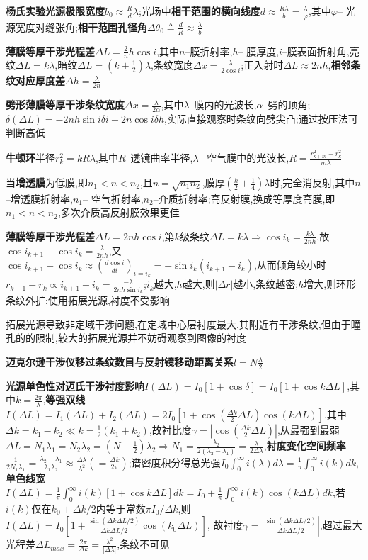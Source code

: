 \documentclass[10pt,a4paper]{article}
\begin{document}
\textbf{杨氏实验光源极限宽度}$b_0\approx\frac{R}{d}\lambda$;光场中\textbf{相干范围的横向线度}$d\approx\frac{R\lambda}{b}=\frac{\lambda}{\varphi}$,其中$\varphi$-- 光源宽度对缝张角;\textbf{相干范围孔径角}$\Delta\theta_0\triangleq\frac{d}{R}\approx\frac{\lambda}{b}$

\textbf{薄膜等厚干涉光程差}$\Delta L=\frac2nh\cos i$,其中$n$--膜折射率,$h$-- 膜厚度,$i$--膜表面折射角,亮纹$\Delta L=k\lambda$,暗纹$\Delta L=(k+\frac{1}{2})\lambda$,条纹宽度$\Delta x=\frac{\lambda}{2\cos i}$;正入射时$\Delta L\approx2nh$,\textbf{相邻条纹对应厚度差}$\Delta h=\frac{\lambda}{2n}$

\textbf{劈形薄膜等厚干涉条纹宽度}$\Delta x=\frac{\lambda}{2\alpha}$,其中$\lambda$--膜内的光波长,$\alpha$--劈的顶角;$\delta(\Delta L)=-2nh\sin i
\delta i+2n\cos i\delta h$,实际直接观察时条纹向劈尖凸;通过按压法可判断高低

\textbf{牛顿环}半径$r_k^2=kR\lambda$,其中$R$--透镜曲率半径,$\lambda$-- 空气膜中的光波长,$R=\frac{r_{k+m}^2-r_k^2}{m\lambda}$

当\textbf{增透膜}为低膜,即$n_1<n<n_2$,且$n=\sqrt{n_1n_2}$,膜厚$(\frac{k}{2}+\frac{1}{4})\lambda$时,完全消反射,其中$n$--增透膜折射率,$n_1$-- 空气折射率,$n_2$--介质折射率;高反射膜,换成等厚度高膜,即$n_1<n<n_2$,多次介质高反射膜效果更佳

\textbf{薄膜等厚干涉光程差}$\Delta L=2nh\cos i$,第$k$级条纹$\Delta L=k\lambda\Longrightarrow\cos i_k=\frac{k\lambda}{2nh}$,故$\cos i_{k+1}-\cos i_{k}=\frac{\lambda}{2nh}$,又$\cos i_{k+1}-\cos i_{k}\approx(\frac{d\cos i}{di})_{i=i_k}=-\sin i_k(i_{k+1}-i_{k})$,从而倾角较小时$r_{k+1}-r_{k}\propto i_{k+1}-i_{k}=\frac{-\lambda}{2nh\sin i_k}$;$i_k$越大,$h$越大,则$|\Delta r|$越小,条纹越密;$h$增大,则环形条纹外扩;使用拓展光源,衬度不受影响

拓展光源导致非定域干涉问题,在定域中心层衬度最大,其附近有干涉条纹,但由于瞳孔的的限制,较大的拓展光源并不妨碍观察到图像的衬度

\textbf{迈克尔逊干涉仪移过条纹数目与反射镜移动距离关系}$l=N\frac{\lambda}{2}$

\textbf{光源单色性对迈氏干涉衬度影响}$I(\Delta L)=I_0[1+\cos\delta]=I_0[1+\cos k\Delta L]$,其中$k=\frac{2\pi}{\lambda}$,\textbf{等强双线}$I(\Delta L)=I_1(\Delta L)+I_2(\Delta L)=2I_0[1+\cos(\frac{\Delta k}{2}\Delta L)\cos(k\Delta L)]$,其中$\Delta k=k_1-k_2\ll k=\frac{1}{2}(k_1+k_2)$,故衬比度$\gamma=|\cos(\frac{\Delta k}{2}\Delta L)|$,从最强到最弱$\Delta L=N_1\lambda_1=N_2\lambda_2=(N-\frac{1}{2})\lambda_2\Longrightarrow N_1=\frac{\lambda_2}{2(\lambda_2-\lambda_1)}=\frac{\lambda}{2\Delta\lambda}$,\textbf{衬度变化空间频率}$\frac{1}{2N_1\lambda_1}=\frac{\lambda_2-\lambda_1}{\lambda_1\lambda_2}\approx\frac{\Delta\lambda}{\lambda^2}(=\frac{\Delta k}{2\pi})$;谱密度积分得总光强$I_0\int_0^\infty i(\lambda)d\lambda=\frac{1}{\pi}\int_0^\infty i(k)dk$,\textbf{单色线宽}$I(\Delta L)=\frac{1}{\pi}\int_0^\infty i(k)[1+\cos k\Delta L]dk=I_0+\frac{1}{\pi}\int_0^\infty i(k)\cos(k\Delta L)dk$,若$i(k)$仅在$k_0\pm\Delta k/2$内等于常数$\pi I_0/\Delta k$,则$I(\Delta L)=I_0[1+\frac{\sin(\Delta k\Delta L/2)}{\Delta k\Delta L/2}\cos(k_0\Delta L)]$, 故衬度$\gamma=|\frac{\sin(\Delta k\Delta L/2)}{\Delta k\Delta L/2}|$,超过最大光程差$\Delta L_{max}=\frac{2\pi}{\Delta k}=\frac{\lambda^2}{|\Delta\lambda|}$,条纹不可见
\end{document}
